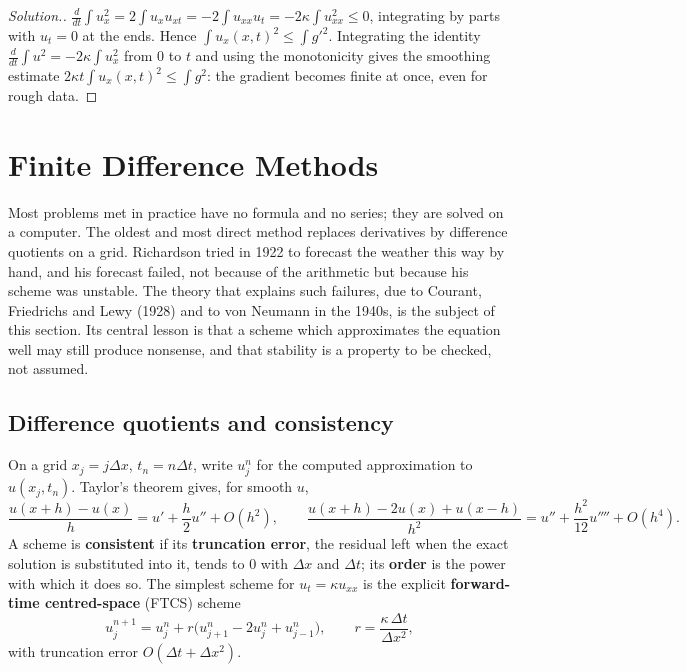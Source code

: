 \documentclass[11pt,a4paper]{article}
\numberwithin{equation}{section}
\theoremstyle{definition}
\newenvironment{solution}
  {\renewcommand{\qedsymbol}{}\begin{proof}[\textit{Solution}.]}
  {\end{proof}}
\begin{document}
\begin{solution}
$\frac{d}{dt}\int u_x^2 = 2\int u_xu_{xt} = -2\int u_{xx}u_t = -2\kappa\int u_{xx}^2 \leq 0$, integrating by parts with $u_t = 0$ at the ends. Hence $\int u_x(x, t)^2 \leq \int g'^2$. Integrating the identity $\frac{d}{dt}\int u^2 = -2\kappa\int u_x^2$ from $0$ to $t$ and using the monotonicity gives the smoothing estimate
$2\kappa t\int u_x(x, t)^2 \leq \int g^2$: the gradient becomes finite at once, even for rough data.
\end{solution}

\section{Finite Difference Methods}
\label{sec:fd}

Most problems met in practice have no formula and no series; they are solved on a computer. The oldest and most direct method replaces derivatives by difference quotients on a grid. Richardson tried in 1922 to forecast the weather this way by hand, and his forecast failed, not because of the arithmetic but
because his scheme was unstable. The theory that explains such failures, due to Courant, Friedrichs and Lewy (1928) and to von Neumann in the 1940s, is the subject of this section. Its central lesson is that a scheme which approximates the equation well may still produce nonsense, and that stability is a
property to be checked, not assumed.

\subsection{Difference quotients and consistency}
\label{ssec:consistency}

On a grid $x_j = j\Delta x$, $t_n = n\Delta t$, write $u_j^n$ for the computed approximation to $u(x_j, t_n)$. Taylor's theorem gives, for smooth $u$,
\[
\frac{u(x + h) - u(x)}{h} = u' + \frac h2u'' + O(h^2), \qquad \frac{u(x + h) - 2u(x) + u(x - h)}{h^2} = u'' + \frac{h^2}{12}u'''' + O(h^4) .
\]
A scheme is \textbf{consistent} if its \textbf{truncation error}, the residual left when the exact solution is substituted into it, tends to $0$ with $\Delta x$ and $\Delta t$; its \textbf{order} is the power with which it does so. The simplest scheme for $u_t = \kappa u_{xx}$ is the explicit
\textbf{forward-time centred-space} (FTCS) scheme
\[
u_j^{n + 1} = u_j^n + r\bigl(u_{j + 1}^n - 2u_j^n + u_{j - 1}^n\bigr), \qquad r = \frac{\kappa\,\Delta t}{\Delta x^2} ,
\]
with truncation error $O(\Delta t + \Delta x^2)$.
\end{document}
